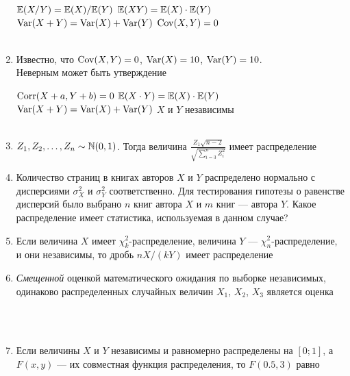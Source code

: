 \documentclass[12pt, a4paper]{article}\usepackage[]{graphicx}\usepackage[]{color}
\begin{document}
\begin{enumerate}
{$\mathbb{E}(X/Y)=\mathbb{E}(X)/\mathbb{E}(Y)$}
{$\mathbb{E}(XY)=\mathbb{E}(X)\cdot\mathbb{E}(Y)$}
{$\operatorname{Var}(X+Y)=\operatorname{Var}(X)+\operatorname{Var}(Y)$}
{$\operatorname{Cov}(X,Y)=0$} \\ \\

\item Известно, что  $\operatorname{Cov}(X,Y)=0$, $\operatorname{Var}(X)=10$, $\operatorname{Var}(Y)=10$. \\
Неверным может быть утверждение

{$\operatorname{Corr}(X+a,Y+b)=0$}
{$\mathbb{E}(X\cdot Y)=\mathbb{E}(X)\cdot \mathbb{E}(Y)$}
{$\operatorname{Var}(X+Y)=\operatorname{Var}(X)+\operatorname{Var}(Y)$}
{$X$ и $Y$ независимы} \\ \\

\item $Z_1,Z_2,\ldots,Z_n\sim\mathbb N(0,1)$. Тогда величина $\frac{Z_1\sqrt{n-2}}{\sqrt{\sum_{i=3}^n Z_i^2}}$ имеет распределение


\item Количество страниц в книгах авторов $X$ и $Y$ распределено нормально с дисперсиями $\sigma^2_X$ и $\sigma^2_Y$ соответственно. Для тестирования гипотезы о равенстве дисперсий было выбрано $n$ книг автора $X$ и $m$ книг — автора $Y$. Какое распределение имеет статистика, используемая в данном случае?


\item Если величина $X$ имеет $\chi^2_k$-распределение, величина $Y$ — $\chi^2_n$-распределение, и они независимы, то дробь $nX/(kY)$ имеет распределение


\item \emph{Смещенной} оценкой математического ожидания по выборке независимых, одинаково распределенных случайных величин $X_1$, $X_2$, $X_3$ является оценка

 \\ \\

\item Если величины $X$ и $Y$ независимы и равномерно распределены на $[0;1]$, а $F(x,y)$ — их совместная функция  распределения, то $F(0.5,3)$ равно


\end{enumerate}
\end{document}
